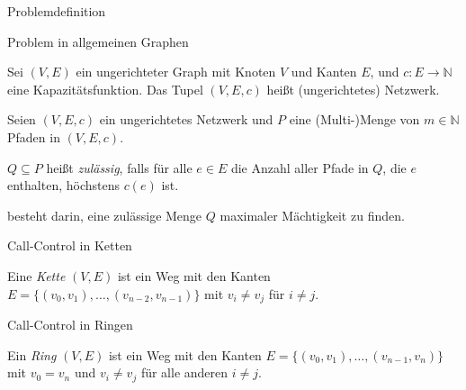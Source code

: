 

\begin{section}{Problemdefinition}
	\begin{frame}{Problem in allgemeinen Graphen}
		\begin{definition}[Netzwerk]
			Sei $(V,E)$ ein ungerichteter Graph mit Knoten $V$ und Kanten $E$, und $c: E \to \mathbb{N}$ eine Kapazitätsfunktion.
			Das Tupel $(V,E,c)$ heißt (ungerichtetes) Netzwerk.
		\end{definition}
		\pause\begin{definition}[\CallControl]
   			Seien $(V,E,c)$ ein ungerichtetes Netzwerk und $P$ eine (Multi-)Menge von $m \in \mathbb{N}$ Pfaden in $(V,E,c)$.

			$Q \subseteq P$ heißt {\em zulässig}, falls für alle $e \in E$ die Anzahl aller Pfade in $Q$,
			die $e$ enthalten, höchstens $c(e)$ ist.

			{\em \CallControl} besteht darin, eine zulässige Menge $Q$ maximaler Mächtigkeit zu finden.
		\end{definition}
	\end{frame}

	\begin{frame}{Call-Control in Ketten}
		\begin{definition}[Kette]
			Eine {\em Kette} $(V,E)$ ist ein Weg mit den Kanten $E=\{(v_0, v_1),\dots,(v_{n-2}, v_{n-1})\}$ mit $v_i \neq v_j$ für $i \neq j$.
		\end{definition}
	
		
	
	\end{frame}

	\begin{frame}{Call-Control in Ringen}
		\begin{definition}[Ring]
			Ein {\em Ring} $(V,E)$ ist ein Weg mit den Kanten $E=\{(v_0, v_1),\dots,(v_{n-1}, v_{n})\}$ mit $v_0 = v_n$ und $v_i \neq v_j$ für alle anderen $i \neq j$.
		\end{definition}
		

\end{frame}
\end{section}
